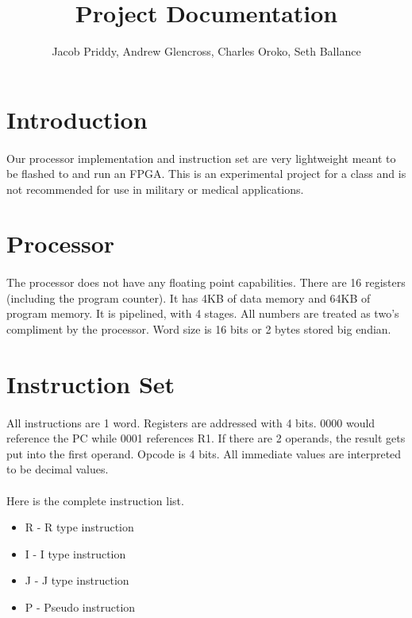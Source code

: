 \documentclass[a4paper]{article}
\title{Project Documentation}
\author{Jacob Priddy, Andrew Glencross, Charles Oroko, Seth Ballance}
\begin{document}
\maketitle

\section{Introduction}
\paragraph{}
Our processor implementation and instruction set are very lightweight meant to be flashed to and run an FPGA. This is an experimental project for a class and is not recommended for use in military or medical applications.

\section{Processor}
\paragraph{}
The processor does not have any floating point capabilities. There are 16 registers (including the program counter). It has 4KB of data memory and 64KB of program memory. It is pipelined, with 4 stages. All numbers are treated as two's compliment by the processor. Word size is 16 bits or 2 bytes stored big endian. 

\section{Instruction Set}
\paragraph{}
All instructions are 1 word. Registers are addressed with 4 bits. 0000 would reference the PC while 0001 references R1. If there are 2 operands, the result gets put into the first operand. Opcode is 4 bits. All immediate values are interpreted to be decimal values.


\paragraph{}
Here is the complete instruction list. 

\begin{itemize}
\item R - R type instruction
\item I - I type instruction
\item J - J type instruction
\item P - Pseudo instruction
\end{itemize}
\end{document}

